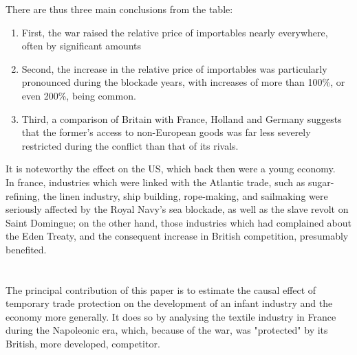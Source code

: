 \documentclass[12pt,a4paper,titlepage,english]{article}
\begin{document}
There are thus three main conclusions from the table:
\begin{enumerate}
\item{First, the war raised the relative price of importables nearly everywhere, often by significant amounts}
\item{Second, the increase in the relative price of importables was particularly pronounced during the blockade years, with increases of more than 100\%, or even 200\%, being common.}
\item{Third, a comparison of Britain with France, Holland and Germany suggests that the former's access to non-European goods was far less severely restricted during the conflict than that of its rivals.}
\end{enumerate}
It is noteworthy the effect on the US, which back then were a young economy.  \\
In france, industries which were linked with the Atlantic trade, such as sugar-refining, the linen industry, ship building, rope-making, and sailmaking were seriously affected by the Royal Navy’s sea blockade, as well as the slave revolt on Saint Domingue; on the other hand, those industries which had complained about the Eden Treaty, and the consequent increase in British competition, presumably benefited.

\section*{\cite{juhasz2014temporary}}
The principal contribution of this paper is to estimate the causal effect of temporary trade protection on the development of an infant industry and the economy more generally. It does so by analysing the textile industry in France during the Napoleonic era, which, because of the war, was "protected" by its British, more developed, competitor. 


\section*{\cite{baier2007free}}



\section*{\cite{daudin2010domestic}}

\section*{\cite{reuveny2001bilateral}}















\pagebreak

\renewcommand{\baselinestretch}{1.0}\normalsize

\renewcommand{\bibname}{\section{References}}




\end{document}
